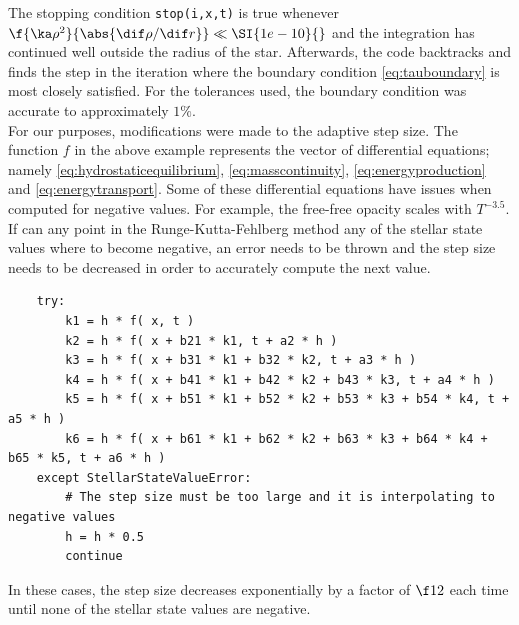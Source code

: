 \documentclass[11pt]{article}
\begin{document}
    The stopping condition \lstinline{stop(i,x,t)} is true whenever $\f{\ka \rho^2}{\abs{\dif \rho / \dif r}} \ll \SI{1e-10}{}$ and the integration has continued well outside the radius of the star. Afterwards, the code backtracks and finds the step in the iteration where the boundary condition \eqref{eq:tauboundary} is most closely satisfied. For the tolerances used, the boundary condition was accurate to approximately $1\%$.\\

    For our purposes, modifications were made to the adaptive step size. The function $f$ in the above example represents the vector of differential equations; namely \eqref{eq:hydrostaticequilibrium}, \eqref{eq:masscontinuity}, \eqref{eq:energyproduction} and \eqref{eq:energytransport}. Some of these differential equations have issues when computed for negative values. For example, the free-free opacity scales with $T^{-3.5}$. If can any point in the Runge-Kutta-Fehlberg method any of the stellar state values where to become negative, an error needs to be thrown and the step size needs to be decreased in order to accurately compute the next value.
    \begin{lstlisting}
    try:
        k1 = h * f( x, t )
        k2 = h * f( x + b21 * k1, t + a2 * h )
        k3 = h * f( x + b31 * k1 + b32 * k2, t + a3 * h )
        k4 = h * f( x + b41 * k1 + b42 * k2 + b43 * k3, t + a4 * h )
        k5 = h * f( x + b51 * k1 + b52 * k2 + b53 * k3 + b54 * k4, t + a5 * h )
        k6 = h * f( x + b61 * k1 + b62 * k2 + b63 * k3 + b64 * k4 + b65 * k5, t + a6 * h )
    except StellarStateValueError:
        # The step size must be too large and it is interpolating to negative values
        h = h * 0.5
        continue
    \end{lstlisting}
    In these cases, the step size decreases exponentially by a factor of $\f12$ each time until none of the stellar state values are negative.
\end{document}
